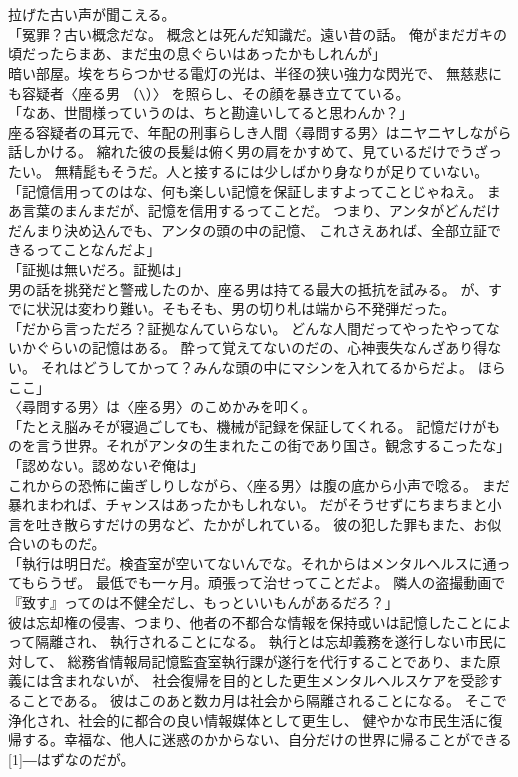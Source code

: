 \documentclass[../NenokuniMain]{subfiles}
\begin{document}
\section{}
拉げた古い声が聞こえる。\\
「冤罪？古い概念だな。
概念とは死んだ知識だ。遠い昔の話。
俺がまだガキの頃だったらまあ、まだ虫の息ぐらいはあったかもしれんが」\\
暗い部屋。埃をちらつかせる電灯の光は、半径の狭い強力な閃光で、
無慈悲にも容疑者〈座る男
（{\tt {}\textbackslash {}}）〉
を照らし、その顔を暴き立てている。\\
「なあ、世間様っていうのは、ちと勘違いしてると思わんか？」\\
座る容疑者の耳元で、年配の刑事らしき人間〈尋問する男〉はニヤニヤしながら話しかける。
縮れた彼の長髪は俯く男の肩をかすめて、見ているだけでうざったい。
無精髭もそうだ。人と接するには少しばかり身なりが足りていない。\\
「記憶信用ってのはな、何も楽しい記憶を保証しますよってことじゃねえ。
まあ言葉のまんまだが、記憶を信用するってことだ。
つまり、アンタがどんだけだんまり決め込んでも、アンタの頭の中の記憶、
これさえあれば、全部立証できるってことなんだよ」\\
「証拠は無いだろ。証拠は」\\
男の話を挑発だと警戒したのか、座る男は持てる最大の抵抗を試みる。
が、すでに状況は変わり難い。そもそも、男の切り札は端から不発弾だった。\\
「だから言っただろ？証拠なんていらない。
どんな人間だってやったやってないかぐらいの記憶はある。
酔って覚えてないのだの、心神喪失なんざあり得ない。
それはどうしてかって？みんな頭の中にマシンを入れてるからだよ。
ほらここ」\\
〈尋問する男〉は〈座る男〉のこめかみを叩く。\\
「たとえ脳みそが寝過ごしても、機械が記録を保証してくれる。
記憶だけがものを言う世界。それがアンタの生まれたこの街であり国さ。観念するこったな」\\
「認めない。認めないぞ俺は」\\
これからの恐怖に歯ぎしりしながら、〈座る男〉は腹の底から小声で唸る。
まだ暴れまわれば、チャンスはあったかもしれない。
だがそうせずにちまちまと小言を吐き散らすだけの男など、たかがしれている。
彼の犯した罪もまた、お似合いのものだ。\\
「執行は明日だ。検査室が空いてないんでな。それからはメンタルヘルスに通ってもらうぜ。
最低でも一ヶ月。頑張って治せってことだよ。
隣人の盗撮動画で『致す』ってのは不健全だし、もっといいもんがあるだろ？」\\
彼は忘却権の侵害、つまり、他者の不都合な情報を保持或いは記憶したことによって隔離され、
執行されることになる。
執行とは忘却義務を遂行しない市民に対して、
総務省情報局記憶監査室執行課が遂行を代行することであり、また原義には含まれないが、
社会復帰を目的とした更生メンタルヘルスケアを受診することである。
彼はこのあと数カ月は社会から隔離されることになる。
そこで浄化され、社会的に都合の良い情報媒体として更生し、
健やかな市民生活に復帰する。幸福な、他人に迷惑のかからない、自分だけの世界に帰ることができる
\scalebox{2}[1]{―}はずなのだが。
\end{document}
